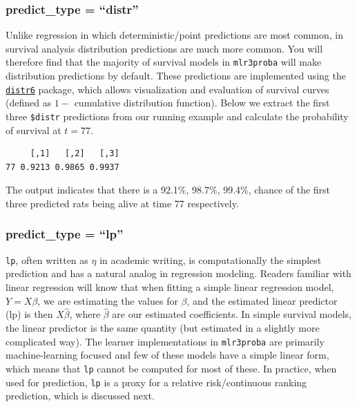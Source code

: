 \hypertarget{predict_type-distr}{%
\subsubsection*{predict\_type = ``distr''}\label{predict_type-distr}}

Unlike regression in which deterministic/point predictions are most
common, in survival analysis distribution predictions are much more
common. You will therefore find that the majority of survival models in
\texttt{mlr3proba} will make distribution predictions by default. These
predictions are implemented using the
\href{https://alan-turing-institute.r-universe.dev/ui\#package:distr6}{\texttt{distr6}}
package, which allows visualization and evaluation of survival curves
(defined as \(1 -\) cumulative distribution function). Below we extract
the first three \texttt{\$distr} predictions from our running example
and calculate the probability of survival at \(t = 77\).

\begin{Shaded}
\begin{Highlighting}[]
\SpecialCharTok{$}\NormalTok{distr[}\SpecialCharTok{:}\NormalTok{]}\SpecialCharTok{$}\NormalTok{(}\NormalTok{)}
\end{Highlighting}
\end{Shaded}

\begin{verbatim}
     [,1]   [,2]   [,3]
77 0.9213 0.9865 0.9937
\end{verbatim}

The output indicates that there is a 92.1\%, 98.7\%, 99.4\%, chance of
the first three predicted rats being alive at time 77 respectively.

\hypertarget{predict_type-lp}{%
\subsubsection*{predict\_type = ``lp''}\label{predict_type-lp}}

\texttt{lp}, often written as \(\eta\) in academic writing, is
computationally the simplest prediction and has a natural analog in
regression modeling. Readers familiar with linear regression will know
that when fitting a simple linear regression model, \(Y = X\beta\), we
are estimating the values for \(\beta\), and the estimated linear
predictor (lp) is then \(X\hat{\beta}\), where
\(\hat{\beta}\) are our estimated coefficients. In simple survival
models, the linear predictor is the same quantity (but estimated in a
slightly more complicated way). The learner implementations in
\texttt{mlr3proba} are primarily machine-learning focused and few of
these models have a simple linear form, which means that \texttt{lp}
cannot be computed for most of these. In practice, when used for
prediction, \texttt{lp} is a proxy for a relative risk/continuous
ranking prediction, which is discussed next.

